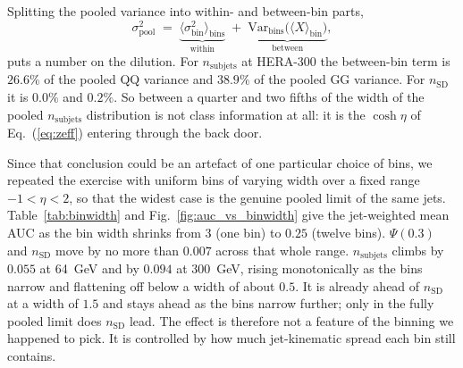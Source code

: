 \documentclass[reprint,amsmath,amssymb,aps,prd,floatfix]{revtex4-2}
\begin{document}
Splitting the pooled variance into within- and between-bin parts,
\begin{equation}
\sigma^2_{\mathrm{pool}} \;=\;
\underbrace{\bigl\langle \sigma^2_{\mathrm{bin}} \bigr\rangle_{\mathrm{bins}}}_{\text{within}}
\;+\;
\underbrace{\mathrm{Var}_{\mathrm{bins}}\bigl(\langle X\rangle_{\mathrm{bin}}\bigr)}_{\text{between}},
\label{eq:vardecomp}
\end{equation}
puts a number on the dilution. For $n_{\mathrm{subjets}}$ at HERA-300 the
between-bin term is $26.6\%$ of the pooled QQ variance and $38.9\%$ of the
pooled GG variance. For $n_{\mathrm{SD}}$ it is $0.0\%$ and $0.2\%$. So between
a quarter and two fifths of the width of the pooled $n_{\mathrm{subjets}}$
distribution is not class information at all: it is the $\cosh\eta$ of
Eq.~(\ref{eq:zeff}) entering through the back door.

Since that conclusion could be an artefact of one particular choice of bins, we
repeated the exercise with uniform bins of varying width over a fixed range
$-1 < \eta < 2$, so that the widest case is the genuine pooled limit of the same
jets. Table~\ref{tab:binwidth} and Fig.~\ref{fig:auc_vs_binwidth} give the
jet-weighted mean AUC as the bin width shrinks from $3$ (one bin) to $0.25$
(twelve bins). $\Psi(0.3)$ and $n_{\mathrm{SD}}$ move by no more than $0.007$
across that whole range. $n_{\mathrm{subjets}}$ climbs by $0.055$ at 64~GeV and
by $0.094$ at 300~GeV, rising monotonically as the bins narrow and flattening off
below a width of about $0.5$. It is already ahead of $n_{\mathrm{SD}}$ at a width
of $1.5$ and stays ahead as the bins narrow further; only in the fully pooled
limit does $n_{\mathrm{SD}}$ lead. The effect is therefore not a feature of the
binning we happened to pick. It is controlled by how much jet-kinematic spread
each bin still contains.
\end{document}
